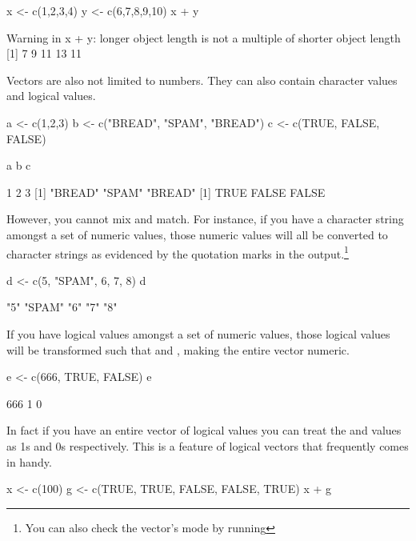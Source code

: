 \begin{inR}
x <- c(1,2,3,4)
y <- c(6,7,8,9,10)
x + y
\end{inR}

\begin{outR}
Warning in x + y: longer object length is not a multiple
of shorter object length
[1]  7  9 11 13 11
\end{outR}

Vectors are also not limited to numbers. They can also contain character values and logical values.
\begin{inR}
a <- c(1,2,3)
b <- c("BREAD", "SPAM", "BREAD")
c <- c(TRUE, FALSE, FALSE)

a
b
c
\end{inR}

\begin{outR}
[1] 1 2 3
[1] "BREAD" "SPAM"  "BREAD"
[1]  TRUE FALSE FALSE
\end{outR}

\noindent
However, you cannot mix and match. For instance, if you have a character string amongst a set of numeric values, those numeric values will all be converted to character strings as evidenced by the quotation marks in the output.\footnote{You can also check the vector's mode by running }

\begin{inR}
d <- c(5, "SPAM", 6, 7, 8)
d
\end{inR}

\begin{outR}
[1] "5"    "SPAM" "6"    "7"    "8"  
\end{outR}

\noindent
If you have logical values amongst a set of numeric values, those logical values will be transformed such that  and , making the entire vector numeric.

\begin{inR}
e <- c(666, TRUE, FALSE)
e
\end{inR}

\begin{outR}
[1] 666   1   0
\end{outR}

\noindent
In fact if you have an entire vector of logical values you can treat the  and  values as 1s and 0s respectively. This is a feature of logical vectors that frequently comes in handy. 

\begin{inR}
x <- c(100)
g <- c(TRUE, TRUE, FALSE, FALSE, TRUE)
x + g
\end{inR}

